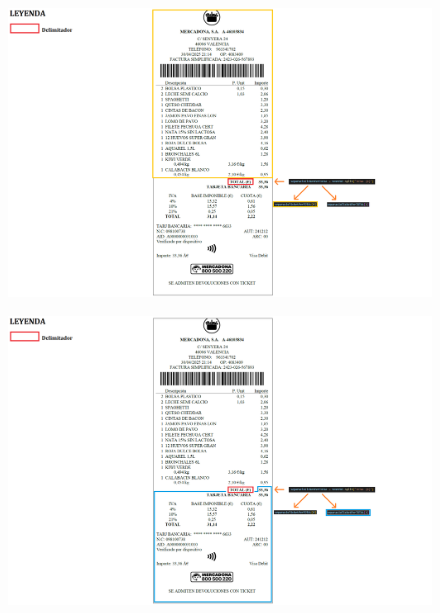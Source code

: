 \documentclass{beamer}
\begin{document}
		\begin{frame}
			\begin{figure}
				\centering
				\includegraphics[width=1\linewidth]{imgEspecifiques/ticketExtraccioC.png}
				\label{fig:ticketExtraccioC}
			\end{figure}
		\end{frame}
		
		\begin{frame}
			\begin{figure}
				\centering
				\includegraphics[width=1\linewidth]{imgEspecifiques/ticketExtraccioD.png}
				\label{fig:ticketExtraccioD}
			\end{figure}
		\end{frame}
		
\end{document}
